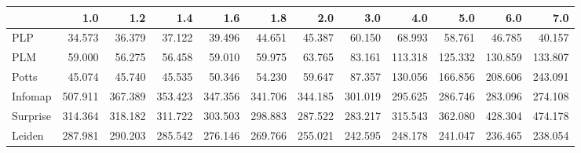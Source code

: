 \begin{tabular}{lrrrrrrrrrrr}
\toprule
{} &     1.0 &     1.2 &     1.4 &     1.6 &     1.8 &     2.0 &     3.0 &     4.0 &     5.0 &     6.0 &     7.0 \\
\midrule
PLP      &  34.573 &  36.379 &  37.122 &  39.496 &  44.651 &  45.387 &  60.150 &  68.993 &  58.761 &  46.785 &  40.157 \\
PLM      &  59.000 &  56.275 &  56.458 &  59.010 &  59.975 &  63.765 &  83.161 & 113.318 & 125.332 & 130.859 & 133.807 \\
Potts    &  45.074 &  45.740 &  45.535 &  50.346 &  54.230 &  59.647 &  87.357 & 130.056 & 166.856 & 208.606 & 243.091 \\
Infomap  & 507.911 & 367.389 & 353.423 & 347.356 & 341.706 & 344.185 & 301.019 & 295.625 & 286.746 & 283.096 & 274.108 \\
Surprise & 314.364 & 318.182 & 311.722 & 303.503 & 298.883 & 287.522 & 283.217 & 315.543 & 362.080 & 428.304 & 474.178 \\
Leiden   & 287.981 & 290.203 & 285.542 & 276.146 & 269.766 & 255.021 & 242.595 & 248.178 & 241.047 & 236.465 & 238.054 \\
\bottomrule
\end{tabular}
